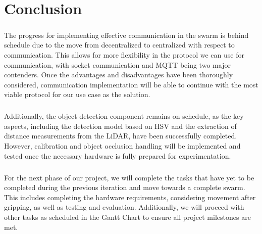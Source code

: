 \chapter{Conclusion}

\paragraph*{}
The progress for implementing effective communication in the swarm is behind schedule due to the move from decentralized to centralized with respect to communication. This allows for more flexibility in the protocol we can use for communication, with socket communication and MQTT being two major contenders. Once the advantages and disadvantages have been thoroughly considered, communication implementation will be able to continue with the most viable protocol for our use case as the solution. 

\paragraph*{}
Additionally, the object detection component remains on schedule, as the key aspects, including the detection model based on HSV and the extraction of distance measurements from the LiDAR, have been successfully completed. However, calibration and object occlusion handling will be implemented and tested once the necessary hardware is fully prepared for experimentation.

\paragraph*{}
For the next phase of our project, we will complete the tasks that have yet to be completed during the previous iteration and move towards a complete swarm. This includes completing the hardware requirements, considering movement after gripping, as well as testing and evaluation. Additionally, we will proceed with other tasks as scheduled in the Gantt Chart to ensure all project milestones are met.
